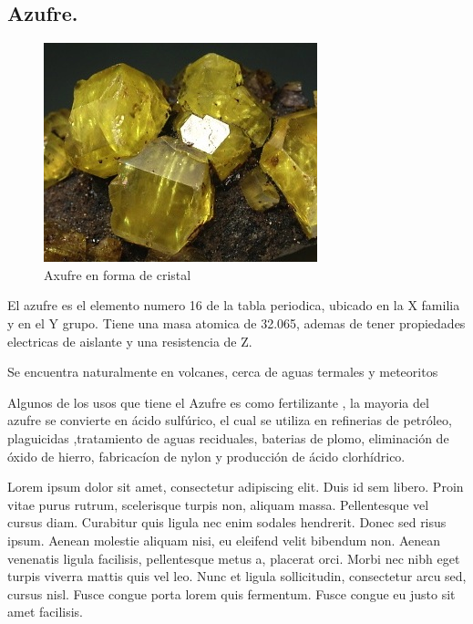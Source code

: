 \documentclass[letter]{article}
\begin{document}
\subsection{Azufre.}
\begin{figure}
	\includegraphics[width=1\linewidth]{azufre} 
	\caption{Axufre en forma de cristal}
	\label{fig:subim1}
\end{figure}
El azufre es el elemento numero 16 de la tabla periodica, ubicado en la X familia y en el Y grupo. Tiene una masa atomica de 32.065, ademas de tener propiedades electricas de aislante y una resistencia de Z.\par
Se encuentra naturalmente en volcanes, cerca de aguas termales y meteoritos \par
Algunos de los usos que tiene el Azufre es como fertilizante \cite{acuna1991fertilizacion}, la mayoria del azufre se convierte en ácido sulfúrico, el cual se utiliza en refinerias de petróleo, plaguicidas  ,tratamiento de aguas reciduales, baterias de plomo, eliminación de óxido de hierro, fabricacíon de nylon y producción de ácido clorhídrico. \par
Lorem ipsum dolor sit amet, consectetur adipiscing elit. Duis id sem libero. Proin vitae purus rutrum, scelerisque turpis non, aliquam massa. Pellentesque vel cursus diam. Curabitur quis ligula nec enim sodales hendrerit. Donec sed risus ipsum. Aenean molestie aliquam nisi, eu eleifend velit bibendum non. Aenean venenatis ligula facilisis, pellentesque metus a, placerat orci. Morbi nec nibh eget turpis viverra mattis quis vel leo. Nunc et ligula sollicitudin, consectetur arcu sed, cursus nisl. Fusce congue porta lorem quis fermentum. Fusce congue eu justo sit amet facilisis.\par
\end{document}

